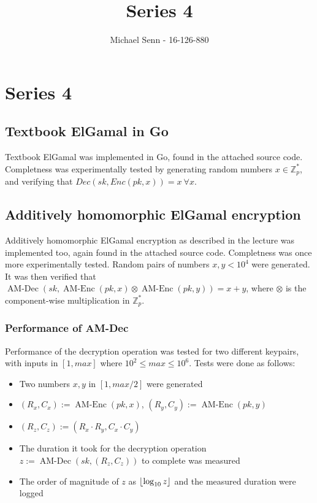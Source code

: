 \documentclass[a4paper]{scrreprt}
\title{Series 4}
\author{Michael Senn \maillink{michael.senn@students.unibe.ch} - 16-126-880}
\date{\printdate}
\DeclarePairedDelimiter\floor{\lfloor}{\rfloor}
\begin{document}
\maketitle


\setcounter{chapter}{3}

\chapter{Series 4}

\section{Textbook ElGamal in Go}

Textbook ElGamal was implemented in Go, found in the attached source code.
Completness was experimentally tested by generating random numbers $x \in
\mathbb{Z}^*_p$, and verifying that $Dec(sk, Enc(pk, x)) = x\ \forall x$.

\section{Additively homomorphic ElGamal encryption}

Additively homomorphic ElGamal encryption as described in the lecture was
implemented too, again found in the attached source code. Completness was once
more experimentally tested. Random pairs of numbers $x, y < 10^4$ were
generated.  It was then verified that $\operatorname{AM-Dec}(sk,
\operatorname{AM-Enc}(pk, x) \otimes \operatorname{AM-Enc}(pk, y)) = x + y$,
where $\otimes$ is the component-wise multiplication  in $\mathbb{Z}_p^*$.

\subsection{Performance of AM-Dec}

Performance of the decryption operation was tested for two different keypairs,
with inputs in $[1, max]$ where $10^2 \leq max \leq 10^6$. Tests were done as
follows:

\begin{itemize}
		\item Two numbers $x, y$ in $[1, max / 2]$ were generated
		\item $(R_x, C_x) := \operatorname{AM-Enc}(pk, x)$, $(R_y, C_y) := \operatorname{AM-Enc}(pk, y)$
		\item $(R_z, C_z) := (R_x \cdot R_y, C_x \cdot C_y)$
		\item The duration it took for the decryption operation $z := \operatorname{AM-Dec}(sk, (R_z, C_z))$ to complete was measured
		\item The order of magnitude of $z$ as $\floor{\log_{10}{z}}$ and the measured duration were logged
\end{itemize}
\end{document}
